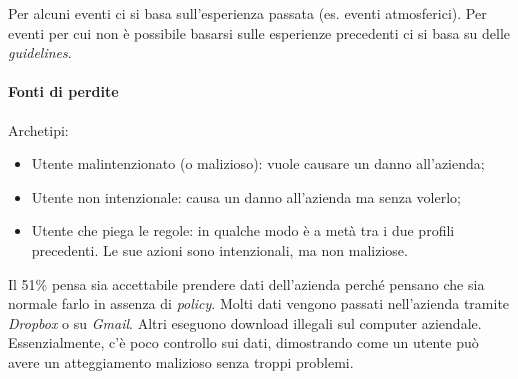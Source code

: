 Per alcuni eventi ci si basa sull'esperienza passata (es. eventi atmosferici).
Per eventi per cui non è possibile basarsi sulle esperienze precedenti ci si
basa su delle \textit{guidelines}.

\paragraph*{Fonti di perdite}

Archetipi:
\begin{itemize}
\item Utente malintenzionato (o malizioso): vuole causare un danno all'azienda;
\item Utente non intenzionale: causa un danno all'azienda ma senza volerlo;
\item Utente che piega le regole: in qualche modo è a metà tra i due profili
precedenti. Le sue azioni sono intenzionali, ma non maliziose.
\end{itemize}

Il 51\% pensa sia accettabile prendere dati dell'azienda perché pensano che sia
normale farlo in assenza di \textit{policy}. Molti dati vengono passati
nell'azienda tramite \textit{Dropbox} o su \textit{Gmail}. Altri eseguono
download illegali sul computer aziendale. Essenzialmente, c'è poco controllo
sui dati, dimostrando come un utente può avere un atteggiamento malizioso senza
troppi problemi.
